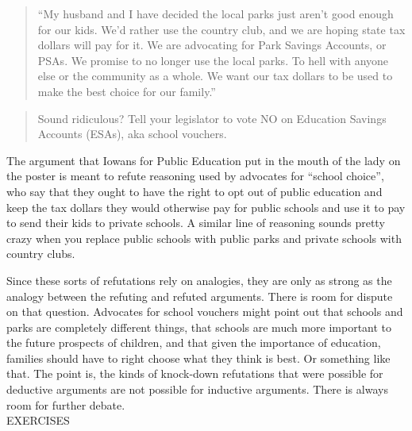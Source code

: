 \begin{quote}
``My husband and I have decided the local parks just aren't good enough for our kids. We'd
rather use the country club, and we are hoping state tax dollars will pay for it. We are
advocating for Park Savings Accounts, or PSAs. We promise to no longer use the local
parks. To hell with anyone else or the community as a whole. We want our tax dollars to
be used to make the best choice for our family.'' \\
\end{quote}

\begin{quote}
Sound ridiculous? Tell your legislator to vote NO on Education Savings Accounts (ESAs),
aka school vouchers.
\end{quote}

The argument that Iowans for Public Education put in the mouth of the lady on the poster is meant
to refute reasoning used by advocates for ``school choice'', who say that they ought to have the
right to opt out of public education and keep the tax dollars they would otherwise pay for public
schools and use it to pay to send their kids to private schools. A similar line of reasoning sounds
pretty crazy when you replace public schools with public parks and private schools with country
clubs.

Since these sorts of refutations rely on analogies, they are only as strong as the analogy between
the refuting and refuted arguments. There is room for dispute on that question. Advocates for
school vouchers might point out that schools and parks are completely different things, that schools
are much more important to the future prospects of children, and that given the importance of
education, families should have to right choose what they think is best. Or something like that.
The point is, the kinds of knock-down refutations that were possible for deductive arguments are
not possible for inductive arguments. There is always room for further debate. \\


EXERCISES \\

